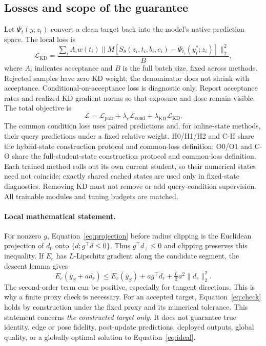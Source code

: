\documentclass[11pt]{article}
\begin{document}
\subsection{Losses and scope of the guarantee}
Let $\Psi_t(y;z_t)$ convert a clean target back into the model's native prediction space. The local loss is
\begin{equation}
 \mathcal L_{\mathrm{KD}}=
 \frac{\sum_i A_i w(t_i)\|M[S_\theta(z_i,t_i,b_i,c_i)-\Psi_{t_i}(y_i^*;z_i)]\|_2^2}
 {B},
\end{equation}
where $A_i$ indicates acceptance and $B$ is the full batch size, fixed across methods. Rejected samples have zero KD weight; the denominator does not shrink with acceptance. Conditional-on-acceptance loss is diagnostic only. Report acceptance rates and realized KD gradient norms so that exposure and dose remain visible. The total objective is
\begin{equation}
 \mathcal L=\mathcal L_{\mathrm{pair}}+
 \lambda_c\mathcal L_{\mathrm{cond}}+
 \lambda_{\mathrm{KD}}\mathcal L_{\mathrm{KD}}.
\end{equation}
The common condition loss uses paired predictions and, for online-state methods, their query predictions under a fixed relative weight. H0/H1/H2 and C-H share the hybrid-state construction protocol and common-loss definition; O0/O1 and C-O share the full-student-state construction protocol and common-loss definition. Each trained method rolls out its own current student, so their numerical states need not coincide; exactly shared cached states are used only in fixed-state diagnostics. Removing KD must not remove or add query-condition supervision. All trainable modules and tuning budgets are matched.

\paragraph{Local mathematical statement.}
For nonzero $g$, Equation~\ref{eq:projection} before radius clipping is the Euclidean projection of $d_0$ onto $\{d:g^\top d\le0\}$. Thus $g^\top d_{\perp}\le0$ and clipping preserves this inequality. If $E_c$ has $L$-Lipschitz gradient along the candidate segment, the descent lemma gives
\begin{equation}
 E_c(\bar y_S+a d_r)\le E_c(\bar y_S)+
 a g^\top d_r+\tfrac{L}{2}a^2\|d_r\|_2^2.
\end{equation}
The second-order term can be positive, especially for tangent directions. This is why a finite proxy check is necessary. For an accepted target, Equation~\ref{eq:check} holds by construction under the fixed proxy and its numerical tolerance. This statement concerns \emph{the constructed target only}. It does not guarantee true identity, edge or pose fidelity, post-update predictions, deployed outputs, global quality, or a globally optimal solution to Equation~\ref{eq:ideal}.
\end{document}
